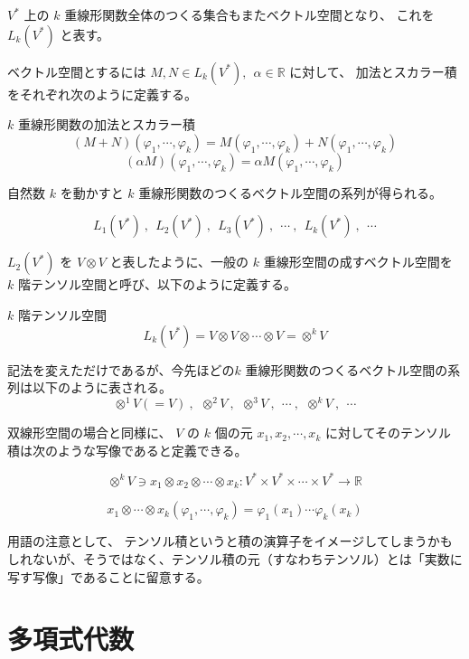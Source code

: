 \documentclass[uplatex,a4j,12pt,dvipdfmx]{jsarticle}
\begin{document}
$V^{*}$ 上の $k$ 重線形関数全体のつくる集合もまたベクトル空間となり、
これを
$L_{k}(V^{*})$
と表す。

ベクトル空間とするには
$M, N \in L_{k}(V^{*}) , \ \ \alpha \in \mathbb{R}$ に対して、
加法とスカラー積をそれぞれ次のように定義する。

\begin{itembox}[l]{$k$ 重線形関数の加法とスカラー積}
	$$
		( M + N ) ( \varphi_{1} , \cdots, \varphi_{k})
		=
		M ( \varphi_{1} , \cdots, \varphi_{k})
		+
		N ( \varphi_{1} , \cdots, \varphi_{k})
	$$
	$$
		( \alpha  M ) ( \varphi_{1} , \cdots, \varphi_{k})
		=
		\alpha M ( \varphi_{1} , \cdots, \varphi_{k})
	$$
\end{itembox}

自然数 $k$ を動かすと $k$ 重線形関数のつくるベクトル空間の系列が得られる。

$$
	L_{1}(V^{*}) \ , \ \ L_{2}(V^{*}) \ , \ \ L_{3}(V^{*}) \ , \ \ \cdots \ , \ \ L_{k}(V^{*}) \ , \ \ \cdots
$$

$L_{2}(V^{*})$ を $V \otimes V$ と表したように、一般の $k$ 重線形空間の成すベクトル空間を
$k$ 階テンソル空間と呼び、以下のように定義する。

\begin{itembox}[l]{$k$ 階テンソル空間}
	$$L_{k}(V^{*}) = V \otimes V \otimes \cdots \otimes V = \otimes^{k} V$$
\end{itembox}

記法を変えただけであるが、今先ほどの$k$ 重線形関数のつくるベクトル空間の系列は以下のように表される。
$$
	\otimes^{1} V (= V) \ , \ \ \otimes^{2} V \ , \ \ \otimes^{3} V \ , \ \ \cdots \ , \ \ \otimes^{k} V \ , \ \ \cdots
$$

双線形空間の場合と同様に、
$V$ の $k$ 個の元 $x_{1}, x_{2} , \cdots , x_{k}$ に対してそのテンソル積は次のような写像であると定義できる。

$$ \otimes^{k} V \ni x_{1} \otimes x_{2} \otimes \cdots \otimes x_{k}: V^* \times V^* \times \cdots \times V^* \to \mathbb{R}$$

$$
	x_{1} \otimes \cdots \otimes x_{k} ( \varphi_{1} , \cdots, \varphi_{k})
	=
	\varphi_{1} (x_{1}) \cdots \varphi_{k} (x_{k})
$$

用語の注意として、
テンソル積というと積の演算子をイメージしてしまうかもしれないが、そうではなく、テンソル積の元（すなわちテンソル）とは「実数に写す写像」であることに留意する。

\section{多項式代数}
\end{document}
